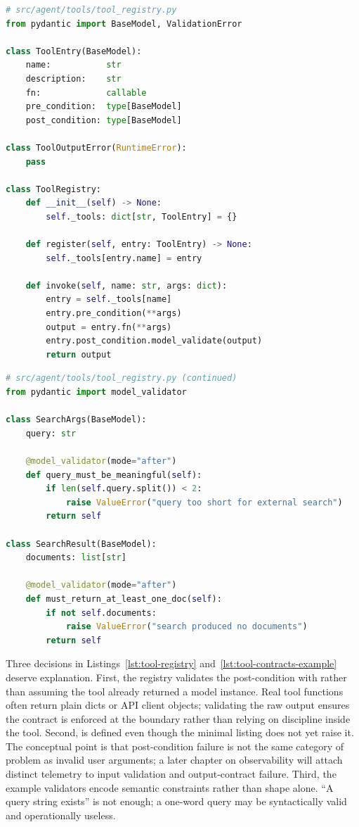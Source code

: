 \begin{lstlisting}[language=Python,
  caption={ToolEntry and ToolRegistry enforce typed pre- and post-conditions},
  label={lst:tool-registry}]
# src/agent/tools/tool_registry.py
from pydantic import BaseModel, ValidationError

class ToolEntry(BaseModel):
    name:           str
    description:    str
    fn:             callable
    pre_condition:  type[BaseModel]
    post_condition: type[BaseModel]

class ToolOutputError(RuntimeError):
    pass

class ToolRegistry:
    def __init__(self) -> None:
        self._tools: dict[str, ToolEntry] = {}

    def register(self, entry: ToolEntry) -> None:
        self._tools[entry.name] = entry

    def invoke(self, name: str, args: dict):
        entry = self._tools[name]
        entry.pre_condition(**args)
        output = entry.fn(**args)
        entry.post_condition.model_validate(output)
        return output
\end{lstlisting}

\begin{lstlisting}[language=Python,
  caption={A concrete tool with validator-backed pre- and post-conditions},
  label={lst:tool-contracts-example}]
# src/agent/tools/tool_registry.py (continued)
from pydantic import model_validator

class SearchArgs(BaseModel):
    query: str

    @model_validator(mode="after")
    def query_must_be_meaningful(self):
        if len(self.query.split()) < 2:
            raise ValueError("query too short for external search")
        return self

class SearchResult(BaseModel):
    documents: list[str]

    @model_validator(mode="after")
    def must_return_at_least_one_doc(self):
        if not self.documents:
            raise ValueError("search produced no documents")
        return self
\end{lstlisting}

Three decisions in Listings~\ref{lst:tool-registry} and~\ref{lst:tool-contracts-example} deserve explanation. First, the registry validates the post-condition with  rather than assuming the tool already returned a model instance. Real tool functions often return plain dicts or API client objects; validating the raw output ensures the contract is enforced at the boundary rather than relying on discipline inside the tool. Second,  is defined even though the minimal listing does not yet raise it. The conceptual point is that post-condition failure is not the same category of problem as invalid user arguments; a later chapter on observability will attach distinct telemetry to input validation and output-contract failure. Third, the example validators encode semantic constraints rather than shape alone. ``A query string exists'' is not enough; a one-word query may be syntactically valid and operationally useless.


